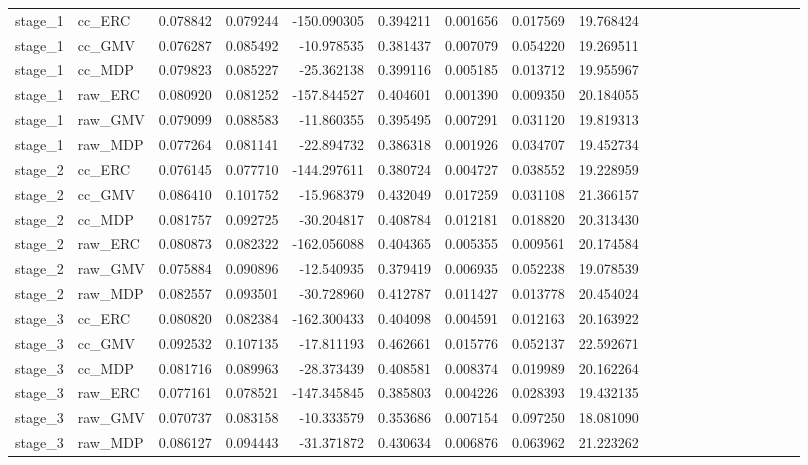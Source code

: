 \begin{tabular}{llrrrrrrrrrrrrrrrrrr}
\toprule
\midrule
stage_1 & cc_ERC & 0.078842 & 0.079244 & -150.090305 & 0.394211 & 0.001656 & 0.017569 & 19.768424 \\
stage_1 & cc_GMV & 0.076287 & 0.085492 & -10.978535 & 0.381437 & 0.007079 & 0.054220 & 19.269511 \\
stage_1 & cc_MDP & 0.079823 & 0.085227 & -25.362138 & 0.399116 & 0.005185 & 0.013712 & 19.955967 \\
stage_1 & raw_ERC & 0.080920 & 0.081252 & -157.844527 & 0.404601 & 0.001390 & 0.009350 & 20.184055 \\
stage_1 & raw_GMV & 0.079099 & 0.088583 & -11.860355 & 0.395495 & 0.007291 & 0.031120 & 19.819313 \\
stage_1 & raw_MDP & 0.077264 & 0.081141 & -22.894732 & 0.386318 & 0.001926 & 0.034707 & 19.452734 \\
stage_2 & cc_ERC & 0.076145 & 0.077710 & -144.297611 & 0.380724 & 0.004727 & 0.038552 & 19.228959 \\
stage_2 & cc_GMV & 0.086410 & 0.101752 & -15.968379 & 0.432049 & 0.017259 & 0.031108 & 21.366157 \\
stage_2 & cc_MDP & 0.081757 & 0.092725 & -30.204817 & 0.408784 & 0.012181 & 0.018820 & 20.313430 \\
stage_2 & raw_ERC & 0.080873 & 0.082322 & -162.056088 & 0.404365 & 0.005355 & 0.009561 & 20.174584 \\
stage_2 & raw_GMV & 0.075884 & 0.090896 & -12.540935 & 0.379419 & 0.006935 & 0.052238 & 19.078539 \\
stage_2 & raw_MDP & 0.082557 & 0.093501 & -30.728960 & 0.412787 & 0.011427 & 0.013778 & 20.454024 \\
stage_3 & cc_ERC & 0.080820 & 0.082384 & -162.300433 & 0.404098 & 0.004591 & 0.012163 & 20.163922 \\
stage_3 & cc_GMV & 0.092532 & 0.107135 & -17.811193 & 0.462661 & 0.015776 & 0.052137 & 22.592671 \\
stage_3 & cc_MDP & 0.081716 & 0.089963 & -28.373439 & 0.408581 & 0.008374 & 0.019989 & 20.162264 \\
stage_3 & raw_ERC & 0.077161 & 0.078521 & -147.345845 & 0.385803 & 0.004226 & 0.028393 & 19.432135 \\
stage_3 & raw_GMV & 0.070737 & 0.083158 & -10.333579 & 0.353686 & 0.007154 & 0.097250 & 18.081090 \\
stage_3 & raw_MDP & 0.086127 & 0.094443 & -31.371872 & 0.430634 & 0.006876 & 0.063962 & 21.223262 \\

\end{tabular}
